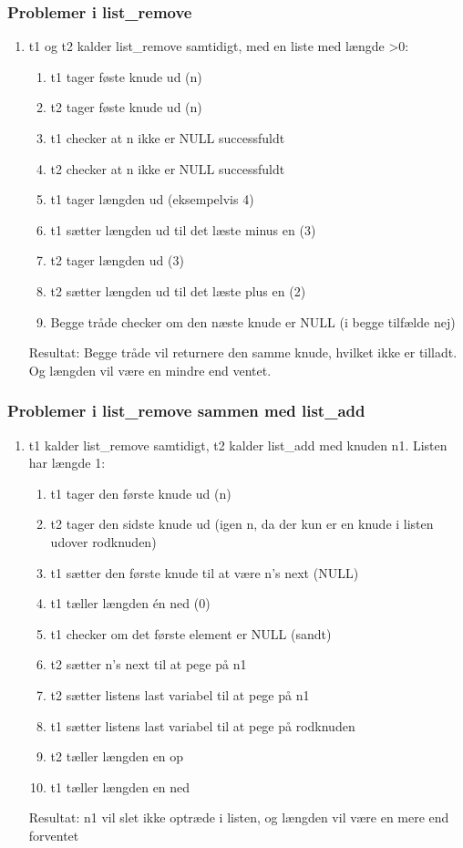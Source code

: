\subsubsection*{Problemer i list\_remove}
\begin{enumerate}
\item t1 og t2 kalder list\_remove samtidigt, med en liste med længde >0:
	\begin{enumerate}
		\item t1 tager føste knude ud (n)
		\item t2 tager føste knude ud (n)
		\item t1 checker at n ikke er NULL successfuldt
		\item t2 checker at n ikke er NULL successfuldt
		\item t1 tager længden ud (eksempelvis 4)
		\item t1 sætter længden ud til det læste minus en (3)
		\item t2 tager længden ud (3)
		\item t2 sætter længden ud til det læste plus en (2)
		\item Begge tråde checker om den næste knude er NULL (i begge tilfælde nej)
   \end{enumerate}
	Resultat: Begge tråde vil returnere den samme knude, hvilket ikke er tilladt. Og længden vil være en mindre end ventet.
\end{enumerate}

\subsubsection*{Problemer i list\_remove sammen med list\_add}
\begin{enumerate}
\item t1 kalder list\_remove samtidigt, t2 kalder list\_add med knuden n1. Listen har længde 1:
	\begin{enumerate}
		\item t1 tager den første knude ud (n)
		\item t2 tager den sidste knude ud (igen n, da der kun er en knude i listen udover rodknuden)
		\item t1 sætter den første knude til at være n's next (NULL)
		\item t1 tæller længden én ned (0)
		\item t1 checker om det første element er NULL (sandt)
		\item t2 sætter n's next til at pege på n1
		\item t2 sætter listens last variabel til at pege på n1
		\item t1 sætter listens last variabel til at pege på rodknuden
		\item t2 tæller længden en op
		\item t1 tæller længden en ned
	\end{enumerate}
	Resultat: n1 vil slet ikke optræde i listen, og længden vil være en mere end forventet
\end{enumerate}


